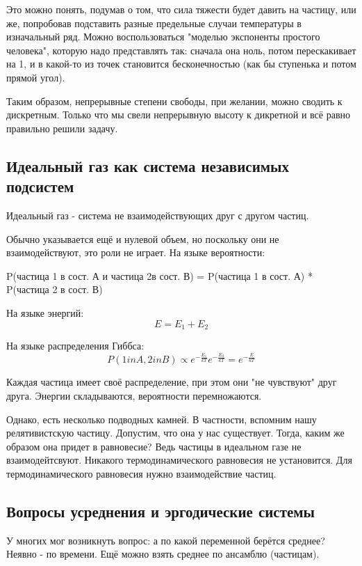 \documentclass[a4paper, 12pt]{article}
\begin{document}
	Это можно понять, подумав о том, что сила тяжести будет давить на частицу, или же, попробовав подставить разные предельные случаи температуры в изначальный ряд. Можно воспользоваться "моделью экспоненты простого человека", которую надо представлять так: сначала она ноль, потом перескакивает на 1, и в какой-то из точек становится бесконечностью (как бы ступенька и потом прямой угол).
	
	Таким образом, непрерывные степени свободы, при желании, можно сводить к дискретным. Только что мы свели непрерывную высоту к дикретной и всё равно правильно решили задачу.
	
	\subsection{Идеальный газ как система независимых подсистем}
	Идеальный газ - система не взаимодействующих друг с другом частиц.
	
	Обычно указывается ещё и нулевой объем, но поскольку они не взаимодействуют, это роли не играет. На языке вероятности:
	
	P(частица 1 в сост. А и частица 2в сост. В) = P(частица 1 в сост. А) * P(частица 2 в сост. В)
	
	На языке энергий: 
	\begin{equation*}
		E = E_{1} + E_{2}
	\end{equation*}
	
	На языке распределения Гиббса:
	\begin{equation*}
		P(1 in A , 2 in B)  \propto{ e^{- \frac{E_{1}}{kT}}  e^{- \frac{E_{2}}{kT}}} =  e^{- \frac{E}{kT}}
	\end{equation*}
	
	Каждая частица имеет своё распределение, при этом они "не чувствуют" друг друга. Энергии складываются, вероятности перемножаются.
	
	Однако, есть несколько подводных камней. В частности, вспомним нашу релятивистскую частицу. Допустим, что она у нас существует. Тогда, каким же образом она придет в равновесие? Ведь частицы в идеальном газе не взаимодейтсвуют. Никакого термодинамического равновесия не установится. Для термодинамического равновесия нужно взаимодействие частиц. 
	\subsection{Вопросы усреднения и эргодические системы}
	У многих мог возникнуть вопрос: а по какой переменной берётся среднее? Неявно - по времени. Ещё можно взять среднее по ансамблю (частицам). 
	
\end{document}
